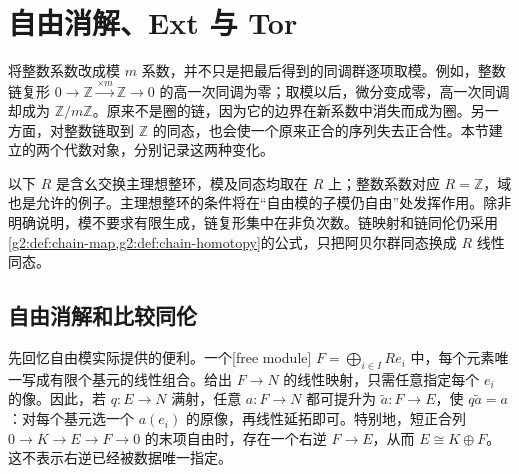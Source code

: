 
% 
% 

\section{自由消解、Ext 与 Tor}
\label{g2:sec:0401}

将整数系数改成模 \(m\) 系数，并不只是把最后得到的同调群逐项取模。例如，整数链复形 \(0\to\mathbb Z\xrightarrow{\times m}\mathbb Z\to0\) 的高一次同调为零；取模以后，微分变成零，高一次同调却成为 \(\mathbb Z/m\mathbb Z\)。原来不是圈的链，因为它的边界在新系数中消失而成为圈。另一方面，对整数链取到 \(\mathbb Z\) 的同态，也会使一个原来正合的序列失去正合性。本节建立的两个代数对象，分别记录这两种变化。

\ProseParagraphBreak

以下 \(R\) 是含幺交换主理想整环，模及同态均取在 \(R\) 上；整数系数对应 \(R=\mathbb Z\)，域也是允许的例子。主理想整环的条件将在“自由模的子模仍自由”处发挥作用。除非明确说明，模不要求有限生成，链复形集中在非负次数。链映射和链同伦仍采用\cref{g2:def:chain-map,g2:def:chain-homotopy}的公式，只把阿贝尔群同态换成 \(R\) 线性同态。

\subsection{自由消解和比较同伦}
\label{g2:subsec:0401:01}
先回忆自由模实际提供的便利。一个[free module] \(F=\bigoplus_{i\in I}Re_i\) 中，每个元素唯一写成有限个基元的线性组合。给出 \(F\to N\) 的线性映射，只需任意指定每个 \(e_i\) 的像。因此，若 \(q:E\to N\) 满射，任意 \(a:F\to N\) 都可提升为 \(\widetilde a:F\to E\)，使 \(q\widetilde a=a\)：对每个基元选一个 \(a(e_i)\) 的原像，再线性延拓即可。特别地，短正合列 \(0\to K\to E\to F\to0\) 的末项自由时，存在一个右逆 \(F\to E\)，从而 \(E\cong K\oplus F\)。这不表示右逆已经被数据唯一指定。

